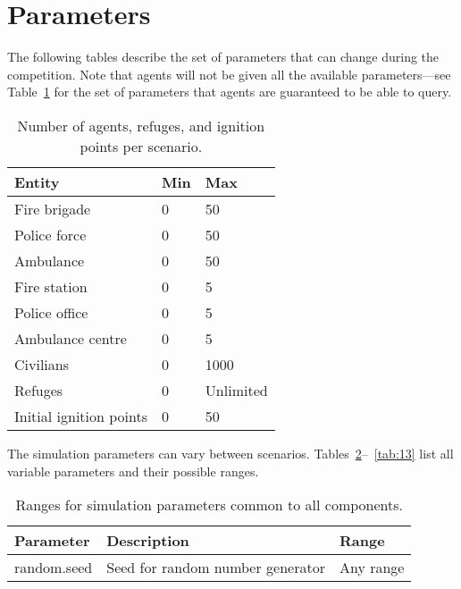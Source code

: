 \documentclass{article}
\begin{document}
\section{Parameters}
\label{sec:parameters}
The following tables describe the set of parameters that can change during the
competition. Note that agents will not be given all the available 
parameters---see Table~\ref{tab:1} for the set of parameters that agents are 
guaranteed to be able to query.
\begin{table}[htb]
\caption{Number of agents, refuges, and ignition points per scenario.}
\label{tab:1}
\centering
\begin{tabular}{lll}
  \hline
  \textbf{Entity}         & \textbf{Min}  & \textbf{Max}\\
  \hline
  Fire brigade            & 0             & 50\\
  Police force            & 0             & 50\\
  Ambulance               & 0             & 50\\
  \hline
  Fire station            & 0             & 5\\
  Police office           & 0             & 5\\
  Ambulance centre        & 0             & 5\\
  \hline
  Civilians               & 0             & 1000\\
  \hline
  Refuges                 & 0             & Unlimited\\
  Initial ignition points & 0             & 50\\
  \hline
\end{tabular}
\end{table}

The simulation parameters can vary between scenarios.
Tables~\ref{tab:2}--~\ref{tab:13} list all variable parameters and their
possible ranges.
\begin{table}[htb]
\caption{Ranges for simulation parameters common to all components.}
\label{tab:2}
\centering
\begin{tabular}{lll}
  \hline
  \textbf{Parameter} & \textbf{Description}              & \textbf{Range}\\
  \hline
  random.seed        & Seed for random number generator  & Any range\\
  \hline
\end{tabular}
\end{table}
\end{document}
